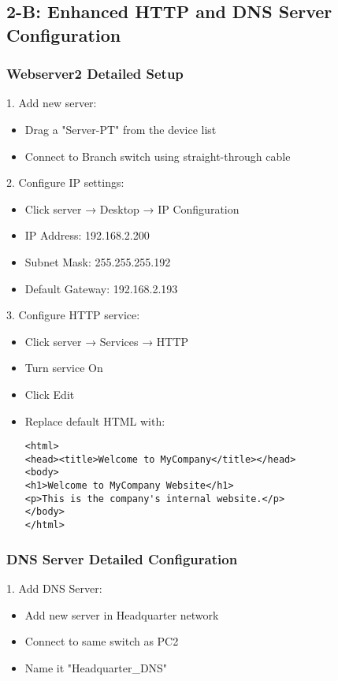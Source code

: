 \documentclass[12pt]{article}
\begin{document}
\subsection{2-B: Enhanced HTTP and DNS Server Configuration}

\subsubsection{Webserver2 Detailed Setup}
1. Add new server:
   \begin{itemize}
   \item Drag a "Server-PT" from the device list
   \item Connect to Branch switch using straight-through cable
   \end{itemize}

2. Configure IP settings:
   \begin{itemize}
   \item Click server → Desktop → IP Configuration
   \item IP Address: 192.168.2.200
   \item Subnet Mask: 255.255.255.192
   \item Default Gateway: 192.168.2.193
   \end{itemize}

3. Configure HTTP service:
   \begin{itemize}
   \item Click server → Services → HTTP
   \item Turn service On
   \item Click Edit
   \item Replace default HTML with:
   \begin{lstlisting}[frame=single]
<html>
<head><title>Welcome to MyCompany</title></head>
<body>
<h1>Welcome to MyCompany Website</h1>
<p>This is the company's internal website.</p>
</body>
</html>
   \end{lstlisting}
   \end{itemize}

\subsubsection{DNS Server Detailed Configuration}
1. Add DNS Server:
   \begin{itemize}
   \item Add new server in Headquarter network
   \item Connect to same switch as PC2
   \item Name it "Headquarter\_DNS"
   \end{itemize}
\end{document}

